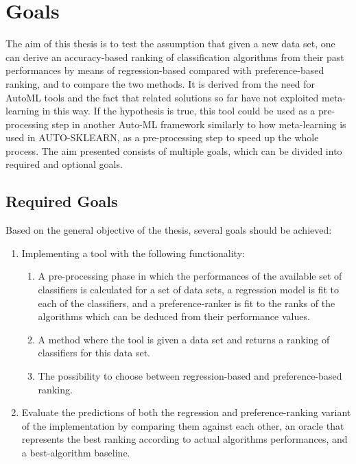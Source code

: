 \documentclass[12pt]{scrartcl}
\begin{document}
\section{Goals}\label{sec:goals}
The aim of this thesis is to test the assumption that given a new data set, one can derive an accuracy-based ranking of classification algorithms from their past performances by means of regression-based compared with preference-based ranking, and to compare the two methods. It is derived from the need for AutoML tools and the fact that related solutions so far have not exploited meta-learning in this way. If the hypothesis is true, this tool could be used as a pre-processing step in another Auto-ML framework similarly to how meta-learning is used in AUTO-SKLEARN, as a pre-processing step to speed up the whole process. The aim presented consists of multiple goals, which can be divided into required and optional goals.

\subsection{Required Goals}\label{subsec:required_goals}
Based on the general objective of the thesis, several goals should be achieved:

\begin{enumerate}
	\item Implementing a tool with the following functionality:
	\begin{enumerate}
		\item A pre-processing phase in which the performances of the available set of classifiers is calculated for a set of data sets, a regression model is fit to each of the classifiers, and a preference-ranker is fit to the ranks of the algorithms which can be deduced from their performance values.
		\item A method where the tool is given a data set and returns a ranking of classifiers for this data set.
		\item The possibility to choose between regression-based and preference-based ranking.
	\end{enumerate}
	\item Evaluate the predictions of both the regression and preference-ranking variant of the implementation by comparing them against each other, an oracle that represents the best ranking according to actual algorithms performances, and a best-algorithm baseline.
\end{enumerate}

\newpage
\end{document}
